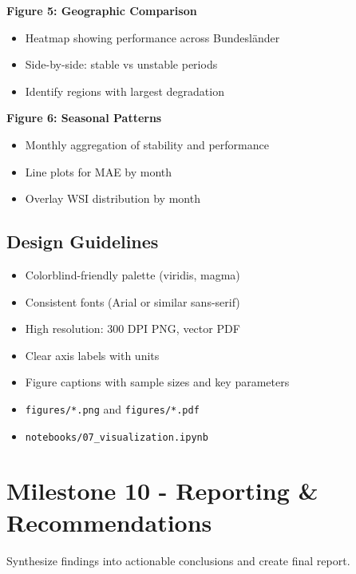 \documentclass[11pt,a4paper]{article}
\begin{document}
\textbf{Figure 5: Geographic Comparison}
\begin{itemize}
    \item Heatmap showing performance across Bundesländer
    \item Side-by-side: stable vs unstable periods
    \item Identify regions with largest degradation
\end{itemize}

\textbf{Figure 6: Seasonal Patterns}
\begin{itemize}
    \item Monthly aggregation of stability and performance
    \item Line plots for MAE by month
    \item Overlay WSI distribution by month
\end{itemize}

\subsection{Design Guidelines}

\begin{itemize}
    \item Colorblind-friendly palette (viridis, magma)
    \item Consistent fonts (Arial or similar sans-serif)
    \item High resolution: 300 DPI PNG, vector PDF
    \item Clear axis labels with units
    \item Figure captions with sample sizes and key parameters
\end{itemize}

\begin{deliverablebox}
\begin{itemize}
    \item \texttt{figures/*.png} and \texttt{figures/*.pdf}
    \item \texttt{notebooks/07\_visualization.ipynb}
\end{itemize}
\end{deliverablebox}

\section{Milestone 10 - Reporting \& Recommendations}

\begin{objectivebox}
Synthesize findings into actionable conclusions and create final report.
\end{objectivebox}
\end{document}
